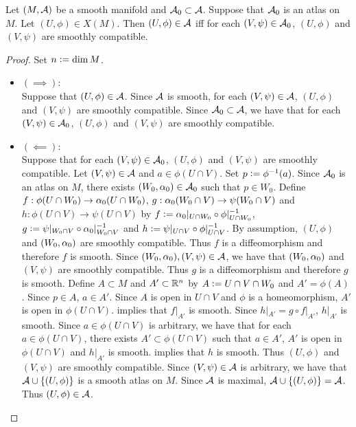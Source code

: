 \documentclass{book}
\begin{document}
	\begin{ex} 
		Let $(M, \mathcal{A})$ be a smooth manifold and $\mathcal{A}_0 \subset \mathcal{A}$. Suppose that $\mathcal{A}_0$ is an atlas on $M$. Let $(U, \phi) \in X(M)$. Then $(U, \phi) \in \mathcal{A}$ iff for each $(V, \psi) \in \mathcal{A}_0$, $(U, \phi)$ and $(V, \psi)$ are smoothly compatible. 
	\end{ex}

	\begin{proof}
		Set $n \vcentcolon= \dim M$.
		\begin{itemize}
			\item $(\implies)$: \\ 
			Suppose that $(U, \phi) \in \mathcal{A}$. Since $\mathcal{A}$ is smooth, for each $(V, \psi) \in \mathcal{A}$, $(U, \phi)$ and $(V, \psi)$ are smoothly compatible. Since $\mathcal{A}_0 \subset \mathcal{A}$, we have that for each $(V, \psi) \in \mathcal{A}_0$, $(U, \phi)$ and $(V, \psi)$ are smoothly compatible.
			\item$(\impliedby)$: \\ 
			Suppose that for each $(V, \psi) \in \mathcal{A}_0$, $(U, \phi)$ and $(V, \psi)$ are smoothly compatible. Let $(V, \psi) \in \mathcal{A}$ and $a \in \phi(U \cap V)$. Set $p \vcentcolon= \phi^{-1}(a)$. Since $\mathcal{A}_0$ is an atlas on $M$, there exists $(W_0, \alpha_0) \in \mathcal{A}_0$ such that $p \in W_0$. Define $f: \phi(U \cap W_0) \rightarrow \alpha_0(U \cap W_0)$, $g: \alpha_0(W_0 \cap V) \rightarrow \psi(W_0 \cap V)$ and $h:\phi(U \cap V) \rightarrow \psi(U \cap V)$ by $f \vcentcolon= \alpha_0|_{U \cap W_0} \circ \phi|_{U \cap W_0}^{-1}$, $g \vcentcolon= \psi|_{W_0 \cap V} \circ \alpha_0|_{W_0 \cap V}^{-1}$ and $h \vcentcolon= \psi|_{U \cap V} \circ \phi|_{U \cap V}^{-1}$. By assumption, $(U, \phi)$ and $(W_0, \alpha_0)$ are smoothly compatible. Thus $f$ is a diffeomorphism and therefore $f$ is smooth. Since $(W_0, \alpha_0), (V, \psi) \in \mathcal{A}$, we have that $(W_0, \alpha_0)$ and $(V, \psi)$ are smoothly compatible. Thus $g$ is a diffeomorphism and therefore $g$ is smooth. Define $A \subset M$ and $A' \subset \mathbb{R}^n$ by $A \vcentcolon= U \cap V \cap W_0$ and $A' = \phi(A)$. Since $p \in A$, $a \in A'$. Since $A$ is open in $U \cap V$ and $\phi$ is a homeomorphism, $A'$ is open in $\phi(U \cap V)$.  implies that $f|_{A'}$ is smooth. Since $h|_{A'} = g \circ f|_{A'}$, $h|_{A'}$ is smooth. Since $a \in \phi(U \cap V)$ is arbitrary, we have that for each $a \in \phi(U \cap V)$, there exists $A' \subset \phi(U \cap V)$ such that $a \in A'$, $A'$ is open in $\phi(U \cap V)$ and $h|_{A'}$ is smooth.  implies that $h$ is smooth. Thus $(U, \phi)$ and $(V, \psi)$ are smoothly compatible. Since $(V, \psi) \in \mathcal{A}$ is arbitrary, we have that $\mathcal{A} \cup \{(U, \phi)\}$ is a smooth atlas on $M$. Since $\mathcal{A}$ is maximal, $\mathcal{A} \cup \{(U, \phi)\} = \mathcal{A}$. Thus $(U, \phi) \in \mathcal{A}$. 
		\end{itemize}
	\end{proof}
\end{document}
